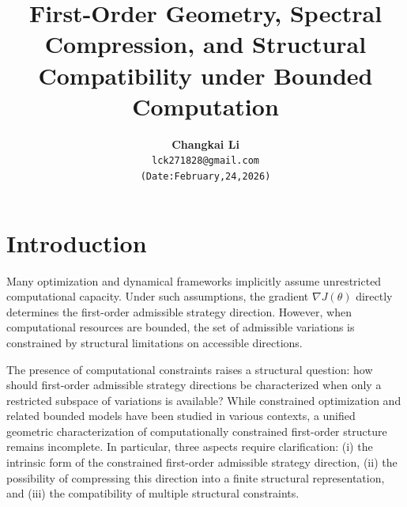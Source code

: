\documentclass[11pt,a4paper,twocolumn]{article}
\date{}
\title{\textbf{First-Order Geometry, Spectral Compression, and Structural Compatibility under Bounded Computation}}
\author{
	\textbf{Changkai Li}\\
	\texttt{lck271828@gmail.com}\\
	\texttt{(Date:February,24,2026)}
}
\begin{document}
 
 
\section{Introduction}

Many optimization and dynamical frameworks implicitly assume
unrestricted computational capacity.
Under such assumptions, the gradient
$\nabla J(\theta)$
directly determines the first-order admissible strategy direction.
However, when computational resources are bounded,
the set of admissible variations is constrained
by structural limitations on accessible directions.

The presence of computational constraints
raises a structural question:
how should first-order admissible strategy directions be characterized
when only a restricted subspace of variations is available?
While constrained optimization and related bounded models
have been studied in various contexts,
a unified geometric characterization of
computationally constrained first-order structure
remains incomplete.
In particular, three aspects require clarification:
(i) the intrinsic form of the constrained first-order admissible strategy direction,
(ii) the possibility of compressing this direction into
a finite structural representation,
and (iii) the compatibility of multiple structural constraints.
\end{document}
